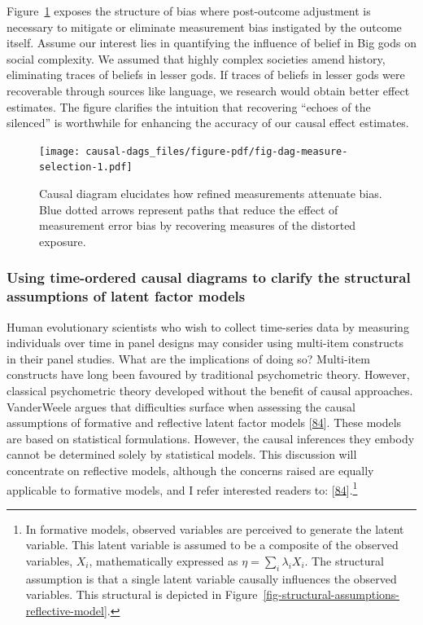 \documentclass[
  singlecolumn]{article}
\begin{document}
Figure~\ref{fig-dag-measure-selection} exposes the structure of bias
where post-outcome adjustment is necessary to mitigate or eliminate
measurement bias instigated by the outcome itself. Assume our interest
lies in quantifying the influence of belief in Big gods on social
complexity. We assumed that highly complex societies amend history,
eliminating traces of beliefs in lesser gods. If traces of beliefs in
lesser gods were recoverable through sources like language, we research
would obtain better effect estimates. The figure clarifies the intuition
that recovering ``echoes of the silenced'' is worthwhile for enhancing
the accuracy of our causal effect estimates.

\begin{figure}

{\centering \texttt{[image: causal-dags\_files/figure-pdf/fig-dag-measure-selection-1.pdf]}

}

\caption{\label{fig-dag-measure-selection}Causal diagram elucidates how
refined measurements attenuate bias. Blue dotted arrows represent paths
that reduce the effect of measurement error bias by recovering measures
of the distorted exposure.}

\end{figure}

\hypertarget{using-time-ordered-causal-diagrams-to-clarify-the-structural-assumptions-of-latent-factor-models}{%
\subsubsection{Using time-ordered causal diagrams to clarify the
structural assumptions of latent factor
models}\label{using-time-ordered-causal-diagrams-to-clarify-the-structural-assumptions-of-latent-factor-models}}

Human evolutionary scientists who wish to collect time-series data by
measuring individuals over time in panel designs may consider using
multi-item constructs in their panel studies. What are the implications
of doing so? Multi-item constructs have long been favoured by
traditional psychometric theory. However, classical psychometric theory
developed without the benefit of causal approaches. VanderWeele argues
that difficulties surface when assessing the causal assumptions of
formative and reflective latent factor models
{[}\protect\hyperlink{ref-vanderweele2022}{84}{]}. These models are
based on statistical formulations. However, the causal inferences they
embody cannot be determined solely by statistical models. This
discussion will concentrate on reflective models, although the concerns
raised are equally applicable to formative models, and I refer
interested readers to:
{[}\protect\hyperlink{ref-vanderweele2022}{84}{]}.\footnote{In formative
  models, observed variables are perceived to generate the latent
  variable. This latent variable is assumed to be a composite of the
  observed variables, \(X_i\), mathematically expressed as
  \(\eta = \sum_i\lambda_i X_i\). The structural assumption is that a
  single latent variable causally influences the observed variables.
  This structural is depicted in
  Figure~\ref{fig-structural-assumptions-reflective-model}.}
\end{document}

